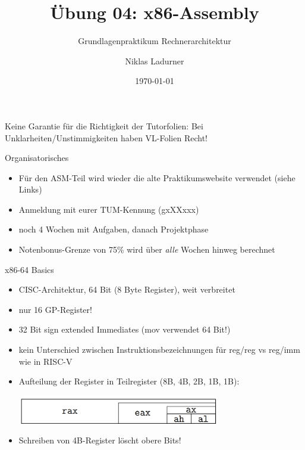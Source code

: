 \documentclass[
  german,            %
  aspectratio=169,    %
]{tumbeamer}
\title{Übung 04: x86-Assembly}
\subtitle{Grundlagenpraktikum Rechnerarchitektur}
\author{Niklas Ladurner}
\institute{\theChairName\\\theDepartmentName\\\theUniversityName}
\date[\today]{\today}
\begin{document}
\maketitle

\begin{frame}[c]{}{}
  \begin{center}
    \LARGE  Keine Garantie für die Richtigkeit der Tutorfolien: Bei Unklarheiten/Unstimmigkeiten
    haben VL-Folien Recht!
  \end{center}
\end{frame}

\begin{frame}[c, fragile]{Organisatorisches}{}
  \begin{itemize}
    \item Für den ASM-Teil wird wieder die alte Praktikumswebsite verwendet (siehe Links)
    \item Anmeldung mit eurer TUM-Kennung (gxXXxxx)
    \item noch 4 Wochen mit Aufgaben, danach Projektphase
    \item Notenbonus-Grenze von 75\% wird über \textit{alle} Wochen hinweg berechnet
  \end{itemize}
\end{frame}

\begin{frame}[c, fragile]{x86-64 Basics}{}
  \begin{itemize}
    \item CISC-Architektur, 64 Bit (8 Byte Register), weit verbreitet
    \item nur 16 GP-Register!
    \item 32 Bit sign extended Immediates (mov verwendet 64 Bit!)
    \item kein Unterschied zwischen Instruktionsbezeichnungen für reg/reg vs reg/imm wie in RISC-V
    \item Aufteilung der Register in Teilregister (8B, 4B, 2B, 1B, 1B):
          \begin{center}
            \includegraphics[width=0.7\textwidth]{w04_reg_div.png}
          \end{center}
    \item Schreiben von 4B-Register löscht obere Bits!
  \end{itemize}
\end{frame}
\end{document}
